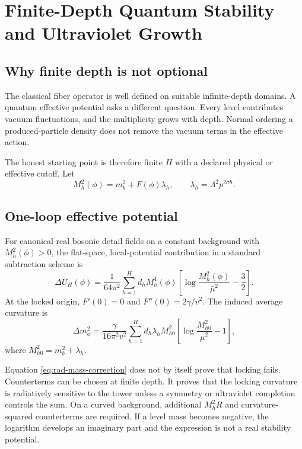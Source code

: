 \chapter{Finite-Depth Quantum Stability and Ultraviolet Growth}
\label{ch:radiative}

\section{Why finite depth is not optional}

The classical fiber operator is well defined on suitable infinite-depth domains.  A quantum effective potential asks a different question.  Every level contributes vacuum fluctuations, and the multiplicity grows with depth.  Normal ordering a produced-particle density does not remove the vacuum terms in the effective action.

The honest starting point is therefore finite $H$ with a declared physical or effective cutoff.  Let
\begin{equation}
M_h^2(\phi)=m_b^2+F(\phi)\lambda_h,
\qquad
\lambda_h=\Lambda^2p^{2\sigma h}.
\label{eq:rad-level-mass}
\end{equation}

\section{One-loop effective potential}

For canonical real bosonic detail fields on a constant background with $M_h^2(\phi)>0$, the flat-space, local-potential contribution in a standard subtraction scheme is
\begin{equation}
\boxed{
\Delta U_H(\phi)
=\frac1{64\pi^2}
\sum_{h=1}^{H}d_hM_h^4(\phi)
\left[
\log\frac{M_h^2(\phi)}{\bar\mu^2}-\frac32
\right].}
\label{eq:rad-CW}
\end{equation}
At the locked origin, $F'(0)=0$ and $F''(0)=2\gamma/v^2$.  The induced average curvature is
\begin{equation}
\boxed{
\Delta m_\phi^2
=\frac\gamma{16\pi^2v^2}
\sum_{h=1}^{H}d_h\lambda_hM_{h0}^2
\left[
\log\frac{M_{h0}^2}{\bar\mu^2}-1
\right],}
\label{eq:rad-mass-correction}
\end{equation}
where $M_{h0}^2=m_b^2+\lambda_h$.

Equation \eqref{eq:rad-mass-correction} does not by itself prove that locking fails.  Counterterms can be chosen at finite depth.  It proves that the locking curvature is radiatively sensitive to the tower unless a symmetry or ultraviolet completion controls the sum.  On a curved background, additional $M_h^2R$ and curvature-squared counterterms are required.  If a level mass becomes negative, the logarithm develops an imaginary part and the expression is not a real stability potential.

